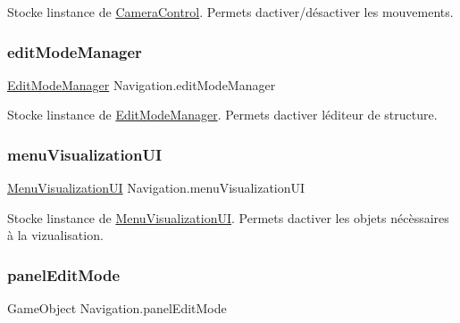 Stocke l\textquotesingle{}instance de \mbox{\hyperlink{class_camera_control}{Camera\+Control}}. Permets d\textquotesingle{}activer/désactiver les mouvements. 

\mbox{\label{class_navigation_a59344933bd9a22b16612407dee4e8aa5}} 
\subsubsection{\texorpdfstring{edit\+Mode\+Manager}{editModeManager}}
{\footnotesize\ttfamily \mbox{\hyperlink{class_edit_mode_manager}{Edit\+Mode\+Manager}} Navigation.\+edit\+Mode\+Manager\hspace{0.3cm}{\ttfamily [private]}}



Stocke l\textquotesingle{}instance de \mbox{\hyperlink{class_edit_mode_manager}{Edit\+Mode\+Manager}}. Permets d\textquotesingle{}activer l\textquotesingle{}éditeur de structure. 

\mbox{\label{class_navigation_affdf26928cacf9c7582cb21ff6bf85dd}} 
\subsubsection{\texorpdfstring{menu\+Visualization\+UI}{menuVisualizationUI}}
{\footnotesize\ttfamily \mbox{\hyperlink{class_menu_visualization_u_i}{Menu\+Visualization\+UI}} Navigation.\+menu\+Visualization\+UI\hspace{0.3cm}{\ttfamily [private]}}



Stocke l\textquotesingle{}instance de \mbox{\hyperlink{class_menu_visualization_u_i}{Menu\+Visualization\+UI}}. Permets d\textquotesingle{}activer les objets nécèssaires à la vizualisation. 

\mbox{\label{class_navigation_aa095d3e8d992350e8452f4c91ca607c9}} 
\subsubsection{\texorpdfstring{panel\+Edit\+Mode}{panelEditMode}}
{\footnotesize\ttfamily Game\+Object Navigation.\+panel\+Edit\+Mode\hspace{0.3cm}{\ttfamily [private]}}



